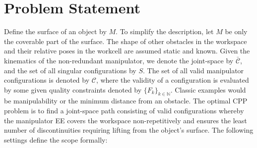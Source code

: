 \documentclass[journal]{IEEEtran}
\begin{document}
\section{Problem Statement}
Define the surface of an object by $M$. To simplify the description, let $M$ be only the coverable part of the surface. 
The shape of other obstacles in the workspace and their relative poses in the workcell are assumed static and known.
Given the kinematics of the non-redundant manipulator, we denote the joint-space by $\bar{\mathscr{C}}$, and the set of all singular configurations by $S$. 
The set of all valid manipulator configurations is denoted by $\mathscr{C}$, where the validity of a configuration is evaluated by some given quality constraints denoted by $\{F_k\}_{k\in \mathbb{N}}$. Classic examples would be manipulability or the minimum distance from an obstacle. 
The optimal CPP problem is to find a joint-space path consisting of valid configurations whereby the manipulator EE covers the workspace non-repetitively 
and ensures the least number of discontinuities requiring lifting from the object's surface. The following settings define the scope formally: 
\end{document}
